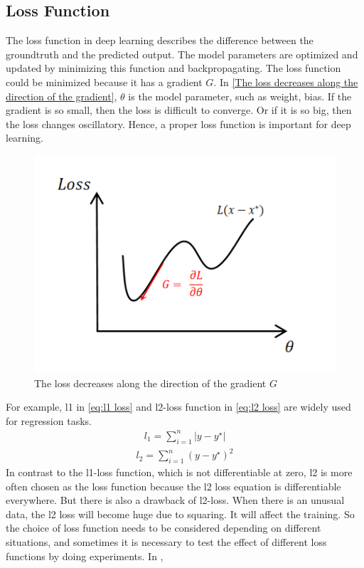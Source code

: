   \subsection{Loss Function}
  The loss function in deep learning describes the difference between the groundtruth and the predicted output. The model parameters are optimized and updated by minimizing 
  this function and backpropagating. The loss function could be minimized because it has a gradient $G$. In \autoref{The loss decreases along the direction of the gradient},
  $\theta$ is the model parameter, such as weight, bias. If the gradient is so small, then the loss is difficult to converge. Or if it is so big, then the loss changes oscillatory.
  Hence, a proper loss function is important for deep learning. 
  \begin{figure}
    \centering
    \includegraphics[width=0.6\linewidth]{example_images/loss function}
    \caption{The loss decreases along the direction of the gradient $G$}
    \label{The loss decreases along the direction of the gradient}
  \end{figure}
  For example, l1 in \autoref{eq:l1 loss} and l2-loss function in \autoref{eq:l2 loss} are widely used for regression tasks.
  \begin{align}
    l_1=\sum_{i=1}^{n} \left | y-y^{\star} \right |  
     \label{eq:l1 loss}
  \end{align}
  \begin{align}
    l_2=\sum_{i=1}^{n}(y-y^{\star})^2
     \label{eq:l2 loss}
  \end{align}
  In contrast to the l1-loss function, which is not differentiable at zero, l2 is more often chosen as the loss function because the l2 loss equation is differentiable everywhere.
  But there is also a drawback of l2-loss. When there is an unusual data, the l2 loss will become huge due to squaring. It will affect the training. So the choice of loss function 
  needs to be considered depending on different situations, and sometimes it is necessary to test the effect of different loss functions by doing experiments. In \cite{Sun_2018_ECCV},

